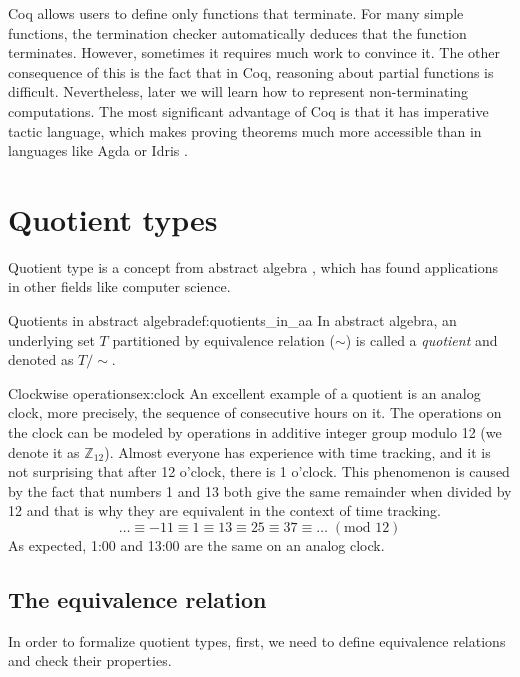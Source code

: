 Coq allows users to define only functions that terminate. For many simple functions, the termination checker automatically deduces that the function terminates. However, sometimes it requires much work to convince it. The other consequence of this is the fact that in Coq, reasoning about partial functions is difficult. Nevertheless, later we will learn how to represent non-terminating computations. The most significant advantage of Coq is that it has imperative tactic language, which makes proving theorems much more accessible than in languages like Agda \cite{agda} or Idris \cite{idris}.

\section{Quotient types}
Quotient type is a concept from abstract algebra \cite{AbstractAlgebra}, which has found applications in other fields like computer science.
\begin{defi}{Quotients in abstract algebra}{def:quotients_in_aa}
In abstract algebra, an underlying set $T$ partitioned by equivalence relation ($\sim$) is called a \emph{quotient} and denoted as $T/\sim$.
\end{defi}
\begin{example}{Clockwise operations}{ex:clock}
An excellent example of a quotient is an analog clock, more precisely, the sequence of consecutive hours on it. The operations on the clock can be modeled by operations in additive integer group modulo 12 (we denote it as $\mathbb{Z}_{12}$). Almost everyone has experience with time tracking, and it is not surprising that after 12 o'clock, there is 1 o'clock. This phenomenon is caused by the fact that numbers 1 and 13 both give the same remainder when divided by 12 and that is why they are equivalent in the context of time tracking.
$$\ldots \equiv -11 \equiv 1 \equiv 13 \equiv 25 \equiv 37 \equiv \ldots \; (\textrm{mod } 12) $$
As expected, 1:00 and 13:00 are the same on an analog clock.
\end{example}

\subsection{The equivalence relation}
In order to formalize quotient types, first, we need to define equivalence relations and check their properties.

